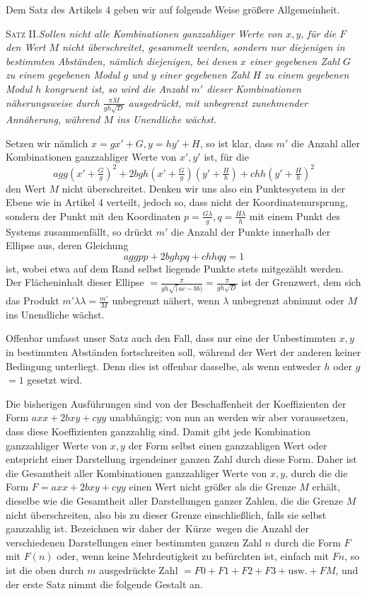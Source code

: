 Dem Satz des Artikels 4 geben wir auf folgende Weise größere Allgemeinheit.

\textsc{Satz II.}\quad\emph{Sollen nicht alle Kombinationen ganzzahliger Werte von $x,y$, für die $F$ den Wert $M$ nicht überschreitet, gesammelt werden, sondern nur diejenigen in bestimmten Abständen, nämlich diejenigen, bei denen $x$ einer gegebenen Zahl $G$ zu einem gegebenen Modul $g$ und $y$ einer gegebenen Zahl $H$ zu einem gegebenen Modul $h$ kongruent ist, so wird die Anzahl $m'$ dieser Kombinationen näherungsweise durch $\frac{\pi M}{gh\surd D}$ ausgedrückt, mit unbegrenzt zunehmender Annäherung, während $M$ ins Unendliche wächst.}

Setzen wir nämlich $x=gx'+G,y=hy'+H$, so ist klar, dass $m'$ die Anzahl aller Kombinationen ganzzahliger Werte von $x',y'$ ist, für die
\[
agg(x'+\tfrac Gg)^2+2bgh(x'+\tfrac Gg)(y'+\tfrac Hh)+chh(y'+\tfrac Hh)^2
\]
den Wert $M$ nicht überschreitet. Denken wir uns also ein Punktesystem in der Ebene wie in Artikel 4 verteilt, jedoch so, dass nicht der Koordinatenursprung, sondern der Punkt mit den Koordinaten $p=\frac{G\lambda}g,q=\frac{H\lambda}h$ mit einem Punkt des Systems zusammenfällt, so drückt $m'$ die Anzahl der Punkte innerhalb der
Ellipse aus, deren Gleichung
\[
aggpp+2bghpq+chhqq=1
\]
ist, wobei etwa auf dem Rand selbst liegende Punkte stets mitgezählt werden. Der Flächeninhalt dieser Ellipse $=\frac\pi{gh\surd(ac-bb)}=\frac\pi{gh\surd D}$ ist der Grenzwert, dem sich das Produkt $m'\lambda\lambda=\frac{m'}M$ unbegrenzt nähert, wenn $\lambda$ unbegrenzt abnimmt oder $M$ ins Unendliche wächst.

Offenbar umfasst unser Satz auch den Fall, dass nur eine der Unbestimmten $x,y$ in bestimmten Abständen fortschreiten soll, während der Wert der anderen keiner Bedingung unterliegt. Denn dies ist offenbar dasselbe, als wenn entweder $h$ oder $g$ $=1$ gesetzt wird.

Die bisherigen Ausführungen sind von der Beschaffenheit der Koeffizienten der Form $axx+2bxy+cyy$ unabhängig; von nun an werden wir aber voraussetzen, dass diese Koeffizienten ganzzahlig sind. Damit gibt jede Kombination ganzzahliger Werte von $x,y$ der Form selbst einen ganzzahligen Wert oder entspricht einer Darstellung irgendeiner ganzen Zahl durch diese Form. Daher ist die Gesamtheit aller Kombinationen ganzzahliger Werte von $x,y$, durch die die Form $F=axx+2bxy+cyy$ einen Wert nicht größer als die Grenze $M$ erhält, dieselbe wie die Gesamtheit aller Darstellungen ganzer Zahlen, die die Grenze $M$ nicht überschreiten, also bis zu dieser Grenze einschließlich, falls sie selbst ganzzahlig ist. Bezeichnen wir daher \mbox{der Kürze wegen} die Anzahl der verschiedenen Darstellungen einer bestimmten ganzen Zahl $n$ durch die Form $F$ mit $F(n)$ oder, wenn keine Mehrdeutigkeit zu befürchten ist, einfach mit $Fn$, so ist die oben durch $m$ ausgedrückte Zahl $=F0+F1+F2+F3+\text{usw.}+FM$, und der erste Satz nimmt die folgende Gestalt an.

